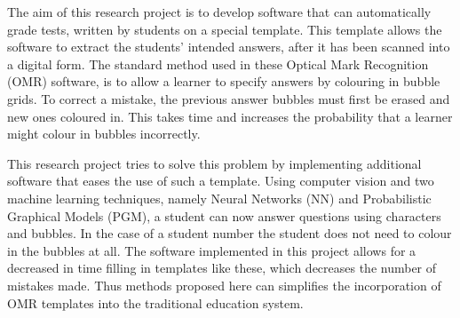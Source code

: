 


\begin{abstracts}        %
The aim of this research project is to develop software that can automatically grade tests, written by students on a special template. This template allows the software to extract the students' intended answers, after it has been scanned into a digital form. The standard method used in these Optical Mark Recognition (OMR) software, is to allow a learner to specify answers by colouring in bubble grids. To correct a mistake, the previous answer bubbles must first be erased and new ones coloured in. This takes time and increases the probability that a learner might colour in bubbles incorrectly. 

This research project tries to solve this problem by implementing additional software that eases the use of such a template. Using computer vision and two machine learning techniques, namely Neural Networks (NN) and Probabilistic Graphical Models (PGM), a student can now answer questions using characters and bubbles. In the case of a student number the student does not need to colour in the bubbles at all. The software implemented in this project allows for a decreased in time filling in templates like these, which decreases the number of mistakes made. Thus methods proposed here can simplifies the incorporation of OMR templates into the traditional education system.
\end{abstracts}
